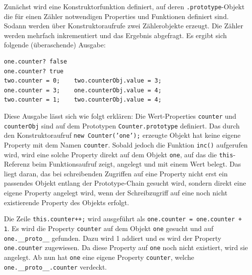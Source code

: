 
Zunächst wird eine Konstruktorfunktion definiert, auf deren \texttt{.prototype}-Objekt die für einen Zähler notwendigen Properties und Funktionen definiert sind.
Sodann werden über Konstruktoraufrufe zwei Zählerobjekte erzeugt. Die Zähler werden mehrfach inkrementiert und das Ergebnis abgefragt. Es ergibt sich folgende (überaschende) Ausgabe:
\begin{verbatim}
one.counter? false
one.counter? true
two.counter = 0;	two.counterObj.value = 3;
one.counter = 3;	one.counterObj.value = 4;
two.counter = 1;	two.counterObj.value = 4;
\end{verbatim}

Diese Ausgabe lässt sich wie folgt erklären: Die Wert-Properties \texttt{counter} und \texttt{coun\-ter\-Obj} sind auf dem Prototypen \texttt{Counter.prototype} definiert. Das durch den Konstruktoraufruf \texttt{new Counter('one');} erzeugte Objekt hat keine eigene Property mit dem Namen \texttt{counter}. Sobald jedoch die Funktion \texttt{inc()} aufgerufen wird, wird eine solche Property direkt auf dem Objekt \texttt{one}, auf das die \texttt{this}-Referenz beim Funktionsaufruf zeigt, angelegt und mit einem Wert belegt. Das liegt daran, das bei schreibenden Zugriffen auf eine Property nicht erst ein passendes Objekt entlang der Prototype-Chain gesucht wird, sondern direkt eine eigene Property angelegt wird, wenn der Schreibzugriff auf eine noch nicht existierende Property des Objekts erfolgt. 

Die Zeile \texttt{this.counter++;} wird ausgeführt als \texttt{one.counter = one.counter + 1}. Es wird die Property \texttt{counter} auf dem Objekt \texttt{one} gesucht und auf \texttt{one.\_\_proto\_\_} gefunden. Dazu wird 1 addiert und es wird der Property \texttt{one.counter} zugewiesen. Da diese Property auf \texttt{one} noch nicht existiert, wird sie angelegt. Ab nun hat \texttt{one} eine eigene Property \texttt{counter}, welche \texttt{one.\_\_proto\_\_.counter} verdeckt.

